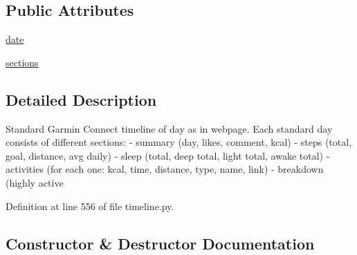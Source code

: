 \subsection*{Public Attributes}
\begin{DoxyCompactItemize}
\item 
\hyperlink{classpygce_1_1models_1_1garmin_1_1timeline_1_1_g_c_day_timeline_a93fbc84cc4bfb4b01ec4678c512dc6f7}{date}
\item 
\hyperlink{classpygce_1_1models_1_1garmin_1_1timeline_1_1_g_c_day_timeline_a2e73f290ffe476624ddc495bb3edd19b}{sections}
\end{DoxyCompactItemize}


\subsection{Detailed Description}
\begin{DoxyVerb}Standard Garmin Connect timeline of day as in webpage.
Each standard day consists of different sections:
- summary (day, likes, comment, kcal)
- steps (total, goal, distance, avg daily)
- sleep (total, deep total, light total, awake total)
- activities (for each one: kcal, time, distance, type, name, link)
- breakdown (highly active %
\end{DoxyVerb}
 

Definition at line 556 of file timeline.\+py.



\subsection{Constructor \& Destructor Documentation}
\mbox{\label{classpygce_1_1models_1_1garmin_1_1timeline_1_1_g_c_day_timeline_a7ac2fc2ad2c247d5ac64c393e9e3c31e}} 
